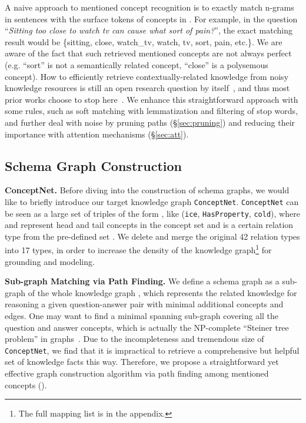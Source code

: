 \documentclass[11pt,a4paper]{article}
\newcommand{\secref}[1]{\S\ref{#1}}
\begin{document}
A naive approach to mentioned concept recognition is 
to exactly match n-grams in sentences with the surface tokens of concepts in .
For example, in the question ``\textit{Sitting too close to watch tv can cause what sort of pain?}'', the exact matching result  would be \{sitting, close, watch\_tv, watch, tv, sort, pain, etc.\}. 
We are aware of the fact that such retrieved mentioned concepts are not always perfect
(e.g. ``sort'' is not a semantically related concept, ``close'' is a polysemous concept).
How to efficiently retrieve contextually-related knowledge from noisy knowledge resources is still an open research question by itself~\cite{weissenborn2017dynamic, Khashabi2017LearningWI}, and thus most prior works choose to stop here~\cite{Zhong2018ImprovingQA, Wang2019ImprovingNL}.
We enhance this straightforward approach with some rules, such as soft matching with lemmatization and filtering of stop words, and further deal with noise by pruning paths (\secref{sec:pruning}) and reducing their importance with attention mechanisms (\secref{sec:att}).




\subsection{Schema Graph Construction}
\label{sec:graphcreate}
\textbf{ConceptNet.} Before diving into the construction of schema graphs, we would like to briefly introduce our target knowledge graph \texttt{ConceptNet}.
\texttt{ConceptNet} can be seen as a large set of triples of the form , like (\texttt{ice}, \texttt{HasProperty}, \texttt{cold}), where  and  represent head and tail concepts in the concept set  and  is a certain relation type from the pre-defined set . 
We delete and merge the original 42 relation types into 17 types, in order to increase the density of the knowledge graph\footnote{The full mapping list is in the \textsf{appendix}.} for grounding and modeling.


\textbf{Sub-graph Matching via Path Finding.}
We define a schema graph as a sub-graph  of the whole knowledge graph , which represents the related knowledge for reasoning a given question-answer pair with minimal additional concepts and edges.
One may want to find a minimal spanning sub-graph covering all the question and answer concepts, 
which is actually the  NP-complete ``Steiner tree problem'' in graphs~\cite{garey1977rectilinear}.
Due to the incompleteness and tremendous size of \texttt{ConceptNet}, we find that it is impractical to retrieve a comprehensive but helpful set of knowledge facts this way.
Therefore, 
we propose a straightforward yet effective graph construction algorithm via path finding among mentioned concepts ().
\end{document}
